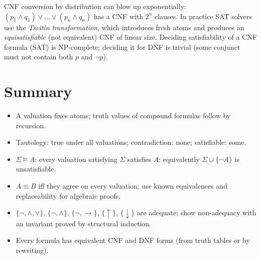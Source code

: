 \begin{aside}
CNF conversion by distribution can blow up exponentially: $(p_1\land q_1)\lor\dots\lor
(p_n\land q_n)$ has a CNF with $2^n$ clauses. In practice SAT solvers use the
\emph{Tseitin transformation}, which introduces fresh atoms and produces an
\emph{equisatisfiable} (not equivalent) CNF of linear size. Deciding satisfiability of a
CNF formula (SAT) is NP-complete; deciding it for DNF is trivial (some conjunct must not
contain both $p$ and $\neg p$).
\end{aside}

\section*{Summary}
\begin{itemize}
  \item A valuation fixes atoms; truth values of compound formulas follow by recursion.
  \item Tautology: true under all valuations; contradiction: none; satisfiable: some.
  \item $\Sigma\models A$: every valuation satisfying $\Sigma$ satisfies $A$; equivalently
        $\Sigma\cup\{\neg A\}$ is unsatisfiable.
  \item $A\equiv B$ iff they agree on every valuation; use known equivalences and
        replaceability for algebraic proofs.
  \item $\{\neg,\land,\lor\}$, $\{\neg,\land\}$, $\{\neg,\to\}$, $\{\uparrow\}$,
        $\{\downarrow\}$ are adequate; show non-adequacy with an invariant proved by
        structural induction.
  \item Every formula has equivalent CNF and DNF forms (from truth tables or by
        rewriting).
\end{itemize}
